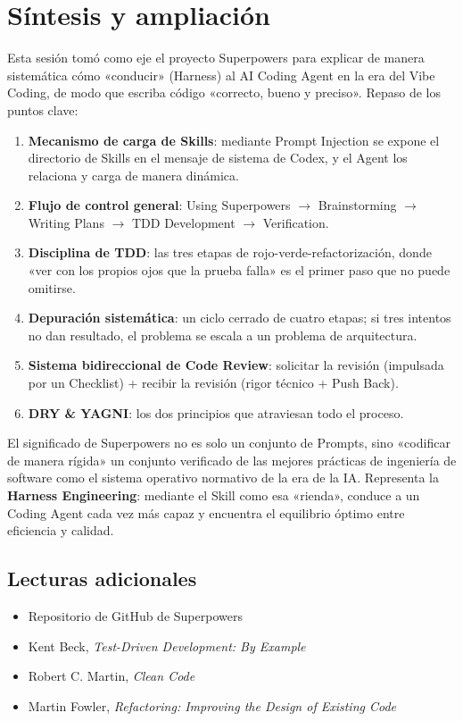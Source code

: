 \section{Síntesis y ampliación}

Esta sesión tomó como eje el proyecto Superpowers para explicar de manera sistemática cómo «conducir» (Harness) al AI Coding Agent en la era del Vibe Coding, de modo que escriba código «correcto, bueno y preciso». Repaso de los puntos clave:

\begin{enumerate}
    \item \textbf{Mecanismo de carga de Skills}: mediante Prompt Injection se expone el directorio de Skills en el mensaje de sistema de Codex, y el Agent los relaciona y carga de manera dinámica.
    \item \textbf{Flujo de control general}: Using Superpowers $\rightarrow$ Brainstorming $\rightarrow$ Writing Plans $\rightarrow$ TDD Development $\rightarrow$ Verification.
    \item \textbf{Disciplina de TDD}: las tres etapas de rojo-verde-refactorización, donde «ver con los propios ojos que la prueba falla» es el primer paso que no puede omitirse.
    \item \textbf{Depuración sistemática}: un ciclo cerrado de cuatro etapas; si tres intentos no dan resultado, el problema se escala a un problema de arquitectura.
    \item \textbf{Sistema bidireccional de Code Review}: solicitar la revisión (impulsada por un Checklist) + recibir la revisión (rigor técnico + Push Back).
    \item \textbf{DRY \& YAGNI}: los dos principios que atraviesan todo el proceso.
\end{enumerate}

El significado de Superpowers no es solo un conjunto de Prompts, sino «codificar de manera rígida» un conjunto verificado de las mejores prácticas de ingeniería de software como el sistema operativo normativo de la era de la IA. Representa la \textbf{Harness Engineering}: mediante el Skill como esa «rienda», conduce a un Coding Agent cada vez más capaz y encuentra el equilibrio óptimo entre eficiencia y calidad.

\subsection{Lecturas adicionales}

\begin{itemize}
    \item Repositorio de GitHub de Superpowers
    \item Kent Beck, \textit{Test-Driven Development: By Example}
    \item Robert C. Martin, \textit{Clean Code}
    \item Martin Fowler, \textit{Refactoring: Improving the Design of Existing Code}
\end{itemize}




